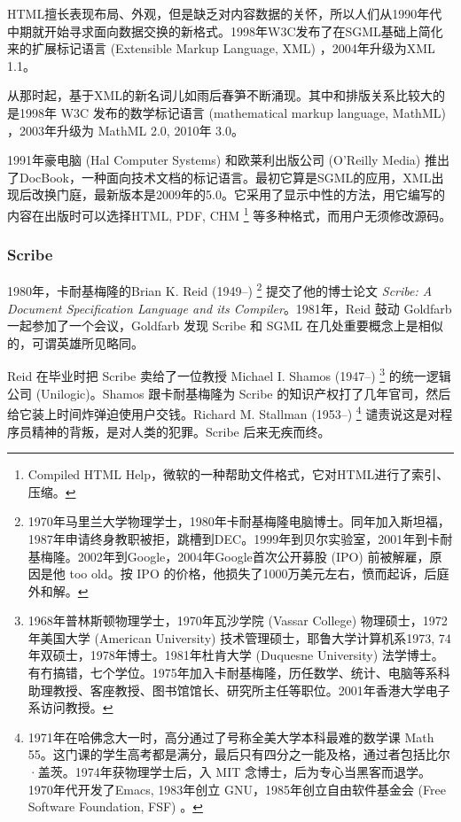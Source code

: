 HTML擅长表现布局、外观，但是缺乏对内容数据的关怀，所以人们从1990年代中期就开始寻求面向数据交换的新格式。1998年W3C发布了在SGML基础上简化来的扩展标记语言 (Extensible Markup Language, XML) ，2004年升级为XML 1.1。

从那时起，基于XML的新名词儿如雨后春笋不断涌现。其中和排版关系比较大的是1998年 W3C 发布的数学标记语言 (mathematical markup language, MathML) ，2003年升级为 MathML 2.0, 2010年 3.0。

1991年豪电脑 (Hal Computer Systems)\indexHal{} 和欧莱利出版公司 (O'Reilly Media)\indexOreilly{} 推出了DocBook，一种面向技术文档的标记语言。最初它算是SGML的应用，XML出现后改换门庭，最新版本是2009年的5.0。它采用了显示中性的方法，用它编写的内容在出版时可以选择HTML, PDF, CHM \footnote{Compiled HTML Help，微软的一种帮助文件格式，它对HTML进行了索引、压缩。} 等多种格式，而用户无须修改源码。

\subsubsection{Scribe}

1980年，卡耐基梅隆的Brian K. Reid (1949--)\indexReid{} \footnote{1970年马里兰大学物理学士，1980年卡耐基梅隆电脑博士。同年加入斯坦福，1987年申请终身教职被拒，跳槽到DEC。1999年到贝尔实验室\indexBell{}，2001年到卡耐基梅隆。2002年到Google，2004年Google首次公开募股 (IPO) 前被解雇，原因是他 too old。按 IPO 的价格，他损失了1000万美元左右，愤而起诉，后庭外和解。} 提交了他的博士论文 \emph{Scribe: A Document Specification Language and its Compiler}。1981年，Reid 鼓动 Goldfarb 一起参加了一个会议，Goldfarb 发现 Scribe 和 SGML 在几处重要概念上是相似的，可谓英雄所见略同。

Reid 在毕业时把 Scribe 卖给了一位教授 Michael I. Shamos (1947--)\indexShamos{} \footnote{1968年普林斯顿物理学士，1970年瓦沙学院 (Vassar College) 物理硕士，1972年美国大学 (American University) 技术管理硕士，耶鲁大学计算机系1973, 74年双硕士，1978年博士。1981年杜肯大学 (Duquesne University) 法学博士。有冇搞错，七个学位。1975年加入卡耐基梅隆，历任数学、统计、电脑等系科助理教授、客座教授、图书馆馆长、研究所主任等职位。2001年香港大学电子系访问教授。} 的统一逻辑公司 (Unilogic)\indexUnilogic{}。Shamos 跟卡耐基梅隆为 Scribe 的知识产权打了几年官司，然后给它装上时间炸弹迫使用户交钱。Richard M. Stallman (1953--)\indexStallman{} \footnote{1971年在哈佛念大一时，高分通过了号称全美大学本科最难的数学课 Math 55。这门课的学生高考都是满分，最后只有四分之一能及格，通过者包括比尔·盖茨。1974年获物理学士后，入 MIT 念博士，后为专心当黑客而退学。1970年代开发了Emacs, 1983年创立 GNU，1985年创立自由软件基金会 (Free Software Foundation, FSF) 。} 谴责说这是对程序员精神的背叛，是对人类的犯罪。Scribe 后来无疾而终。

